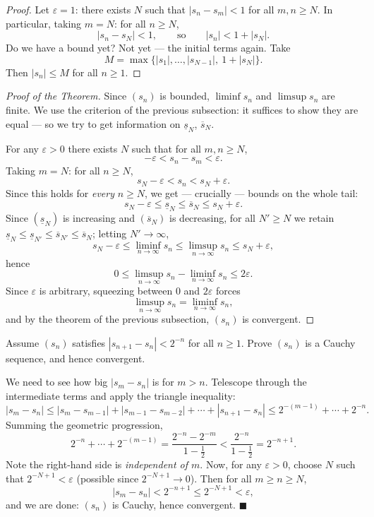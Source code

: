 \documentclass[11pt]{report}
\begin{document}
\begin{proof}
Let $\varepsilon = 1$: there exists $N$ such that $|s_n - s_m| < 1$ for all $m, n \geq N$. In particular, taking $m = N$: for all $n \geq N$,
\[
|s_n - s_N| < 1, \qquad \text{so} \qquad |s_n| < 1 + |s_N|.
\]
Do we have a bound yet? Not yet --- the initial terms again. Take
\[
M = \max\{|s_1|, \ldots, |s_{N-1}|,\ 1 + |s_N|\}.
\]
Then $|s_n| \leq M$ for all $n \geq 1$.
\end{proof}

\begin{proof}[Proof of the Theorem]
Since $(s_n)$ is bounded, $\liminf s_n$ and $\limsup s_n$ are finite. We use the criterion of the previous subsection: it suffices to show they are equal --- so we try to get information on $\underline{s}_N$, $\overline{s}_N$.

For any $\varepsilon > 0$ there exists $N$ such that for all $m, n \geq N$,
\[
-\varepsilon < s_n - s_m < \varepsilon.
\]
Taking $m = N$: for all $n \geq N$,
\[
s_N - \varepsilon < s_n < s_N + \varepsilon.
\]
Since this holds for \emph{every} $n \geq N$, we get --- crucially --- bounds on the whole tail:
\[
s_N - \varepsilon \leq \underline{s}_N \leq \overline{s}_N \leq s_N + \varepsilon.
\]
Since $(\underline{s}_N)$ is increasing and $(\overline{s}_N)$ is decreasing, for all $N' \geq N$ we retain $\underline{s}_{N} \leq \underline{s}_{N'} \leq \overline{s}_{N'} \leq \overline{s}_{N}$; letting $N' \to \infty$,
\[
s_N - \varepsilon \leq \liminf_{n\to\infty} s_n \leq \limsup_{n\to\infty} s_n \leq s_N + \varepsilon,
\]
hence
\[
0 \leq \limsup_{n\to\infty} s_n - \liminf_{n\to\infty} s_n \leq 2\varepsilon.
\]
Since $\varepsilon$ is arbitrary, squeezing between $0$ and $2\varepsilon$ forces
\[
\limsup_{n\to\infty} s_n = \liminf_{n\to\infty} s_n,
\]
and by the theorem of the previous subsection, $(s_n)$ is convergent.
\end{proof}

\begin{exbox}
Assume $(s_n)$ satisfies $|s_{n+1} - s_n| < 2^{-n}$ for all $n \geq 1$. Prove $(s_n)$ is a Cauchy sequence, and hence convergent.

We need to see how big $|s_m - s_n|$ is for $m > n$. Telescope through the intermediate terms and apply the triangle inequality:
\[
|s_m - s_n| \leq |s_m - s_{m-1}| + |s_{m-1} - s_{m-2}| + \cdots + |s_{n+1} - s_n|
\leq 2^{-(m-1)} + \cdots + 2^{-n}.
\]
Summing the geometric progression,
\[
2^{-n} + \cdots + 2^{-(m-1)} = \frac{2^{-n} - 2^{-m}}{1 - \tfrac12} < \frac{2^{-n}}{1 - \tfrac12} = 2^{-n+1}.
\]
Note the right-hand side is \emph{independent of $m$}. Now, for any $\varepsilon > 0$, choose $N$ such that $2^{-N+1} < \varepsilon$ (possible since $2^{-N+1} \to 0$). Then for all $m \geq n \geq N$,
\[
|s_m - s_n| < 2^{-n+1} \leq 2^{-N+1} < \varepsilon,
\]
and we are done: $(s_n)$ is Cauchy, hence convergent. \hfill $\blacksquare$
\end{exbox}
\end{document}
